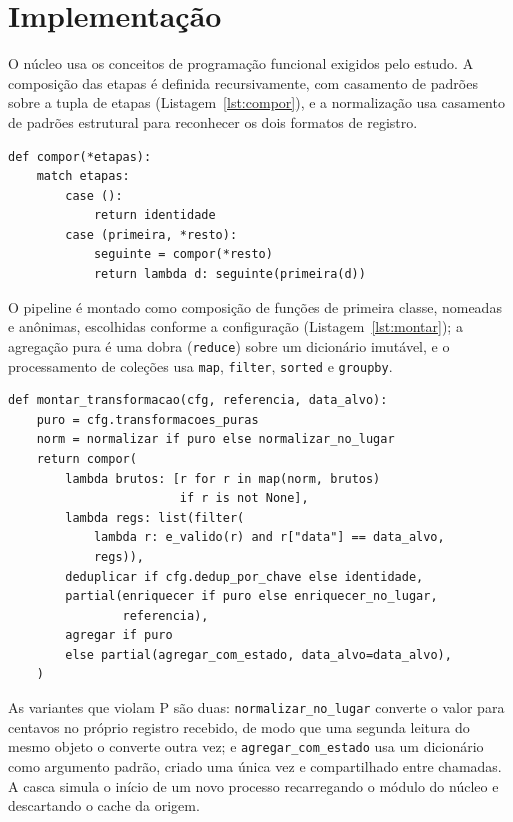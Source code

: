 \section{Implementação}

O núcleo usa os conceitos de programação funcional exigidos pelo estudo. A composição das etapas é definida recursivamente, com casamento de padrões sobre a tupla de etapas (Listagem~\ref{lst:compor}), e a normalização usa casamento de padrões estrutural para reconhecer os dois formatos de registro.

\begin{lstlisting}[float=t,caption={Composição recursiva das etapas},label={lst:compor}]
def compor(*etapas):
    match etapas:
        case ():
            return identidade
        case (primeira, *resto):
            seguinte = compor(*resto)
            return lambda d: seguinte(primeira(d))
\end{lstlisting}

O pipeline é montado como composição de funções de primeira classe, nomeadas e anônimas, escolhidas conforme a configuração (Listagem~\ref{lst:montar}); a agregação pura é uma dobra (\texttt{reduce}) sobre um dicionário imutável, e o processamento de coleções usa \texttt{map}, \texttt{filter}, \texttt{sorted} e \texttt{groupby}.

\begin{lstlisting}[float=t,caption={Montagem do núcleo conforme os fatores P e D (trecho adaptado)},label={lst:montar}]
def montar_transformacao(cfg, referencia, data_alvo):
    puro = cfg.transformacoes_puras
    norm = normalizar if puro else normalizar_no_lugar
    return compor(
        lambda brutos: [r for r in map(norm, brutos)
                        if r is not None],
        lambda regs: list(filter(
            lambda r: e_valido(r) and r["data"] == data_alvo,
            regs)),
        deduplicar if cfg.dedup_por_chave else identidade,
        partial(enriquecer if puro else enriquecer_no_lugar,
                referencia),
        agregar if puro
        else partial(agregar_com_estado, data_alvo=data_alvo),
    )
\end{lstlisting}

As variantes que violam P são duas: \texttt{normalizar\_no\_lugar} converte o valor para centavos no próprio registro recebido, de modo que uma segunda leitura do mesmo objeto o converte outra vez; e \texttt{agregar\_com\_estado} usa um dicionário como argumento padrão, criado uma única vez e compartilhado entre chamadas. A casca simula o início de um novo processo recarregando o módulo do núcleo e descartando o cache da origem.

